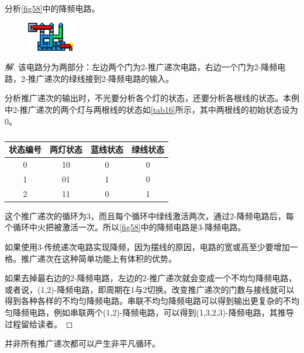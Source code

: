 \begin{example}
分析\autoref{fig58}中的降频电路。
\begin{figure}[!ht]
\centering
\includegraphics{images/332.png}
\caption{}\label{fig58}
\end{figure}
\end{example}
\begin{proof}[解]
该电路分为两部分：左边两个门为2-推广递次电路，右边一个门为2-降频电路，2-推广递次的绿线接到2-降频电路的输入。

分析推广递次的输出时，不光要分析各个灯的状态，还要分析各根线的状态。本例中2-推广递次的两个灯与两根线的状态如\autoref{tab16}所示，其中两根线的初始状态设为0。

\begin{table}
\centering
\begin{tabular}{|c|c|c|c|}
\hline
状态编号&两灯状态&蓝线状态&绿线状态\\\hline
0&10&0&0\\\hline
1&01&1&0\\\hline
2&11&0&1\\\hline
\end{tabular}
\caption{}\label{tab16}
\end{table}

这个推广递次的循环为3，而且每个循环中绿线激活两次，通过2-降频电路后，每个循环中火把被激活一次。所以\autoref{fig58}中的降频电路是3-降频电路。

如果使用3-传统递次电路实现降频，因为摆线的原因，电路的宽或高至少要增加一格。推广递次在这种简单功能上有体积的优势。

如果去掉最右边的2-降频电路，左边的2-推广递次就会变成一个不均匀降频电路，或者说，(1,2)-降频电路，即周期在1与2切换。改变推广递次的门数与接线就可以得到各种各样的不均匀降频电路。串联不均匀降频电路可以得到输出更复杂的不均匀降频电路，例如串联两个(1,2)-降频电路，可以得到(1,3,2,3)-降频电路，其推导过程留给读者。

\end{proof}

并非所有推广递次都可以产生非平凡循环。


